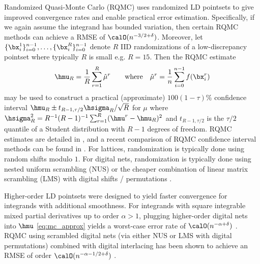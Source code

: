 \documentclass[acmsmall]{acmart}
\begin{document}
Randomized Quasi-Monte Carlo (RQMC) uses randomized LD pointsets to give improved convergence rates and enable practical error estimation. Specifically, if we again assume the integrand has bounded variation, then certain RQMC methods can achieve a RMSE of $\calO(n^{-3/2+\delta})$. Moreover, let $\{\bx_i^1\}_{i=0}^{n-1}, \dots, \{\bx_i^R\}_{i=0}^{n-1}$ denote $R$ IID randomizations of a low-discrepancy pointset where typically $R$ is small e.g. $R=15$. Then the RQMC estimate 
\begin{equation}
    \hmu_R = \frac{1}{R} \sum_{r=1}^R \hat{\mu}^r \qquad \text{where} \quad \hat{\mu}^r = \frac{1}{n} \sum_{i=0}^{n-1} f(\bx_i^r)
    \label{eq:RQMC}
\end{equation}
may be used to construct a practical (approximate) $100(1-\tau)\%$ confidence interval $\hmu_R \pm t_{R-1,\tau/2} \hsigma_R/\sqrt{R}$ for $\mu$ where $\hsigma_R^2 = R^{-1}(R-1)^{-1} \sum_{r=1}^R (\hmu^r - \hmu_R)^2$ and $t_{R-1,\tau/2}$ is the $\tau/2$ quantile of a Student distribution with $R-1$ degrees of freedom. RQMC estimates are detailed in \citep[Chapter 17]{owen.mc_book}, and a recent comparison of RQMC confidence interval methods can be found in \citep{l2023confidence}. For lattices, randomization is typically done using random shifts modulo $1$. For digital nets, randomization is typically done using nested uniform scrambling (NUS) or the cheaper combination of linear matrix scrambling (LMS) with digital shifts / permutations \citep{owen.variance_alternative_scrambles_digital_net,owen_halton,owen.gain_coefficients_scrambled_halton}.

Higher-order LD pointsets were designed to yield faster convergence for integrands with additional smoothness. For integrands with square integrable mixed partial derivatives up to order $\alpha>1$, plugging higher-order digital nets into $\hmu$ \eqref{eq:mc_approx} yields a worst-case error rate of $\calO(n^{-\alpha+\delta})$ \citep{dick.walsh_spaces_HO_nets,dick.qmc_HO_convergence_MCQMC2008,dick.decay_walsh_coefficients_smooth_functions}. RQMC using scrambled digital nets (via either NUS or LMS with digital permutations) combined with digital interlacing has been shown to achieve an RMSE of order $\calO(n^{-\alpha-1/2+\delta})$ \citep{dick.higher_order_scrambled_digital_nets}. %
\end{document}
